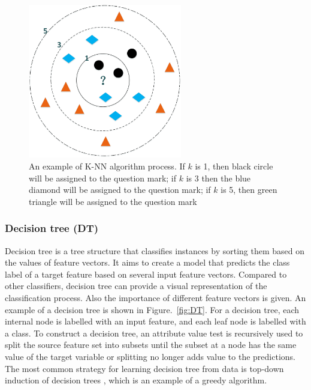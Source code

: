 \begin{figure}[htb!]
\centering
\includegraphics[width=0.6\textwidth]{image/Method/KNN.png}
\caption[A K-NN classifier]{An example of K-NN algorithm process. If $k$ is 1, then black circle will be assigned to the question mark; if $k$ is 3 then the blue diamond will be assigned to the question mark; if $k$ is 5, then green triangle will be assigned to the question mark}
\label{fig:K-NN}
\end{figure}




\subsubsection{Decision tree (DT)}
Decision tree is a tree structure that classifies instances by sorting them based on the values of feature vectors. It aims to create a model that predicts the class label of a target feature based on several input feature vectors.  Compared to other classifiers, decision tree can provide a visual representation of the classification process. Also the importance of different feature vectors is given. An example of a decision tree is shown in Figure.~\ref{fig:DT}.  For a decision tree, each internal node is labelled with an input feature, and each leaf node is labelled with a class. To construct a decision tree, an attribute value test is recursively used to split the source feature set into subsets until the subset at a node has the same value of the target variable or splitting no longer adds value to the predictions. The most common strategy for learning decision tree from data is top-down induction of decision trees \citep{quinlan1986induction}, which is an example of a greedy algorithm. 
 

